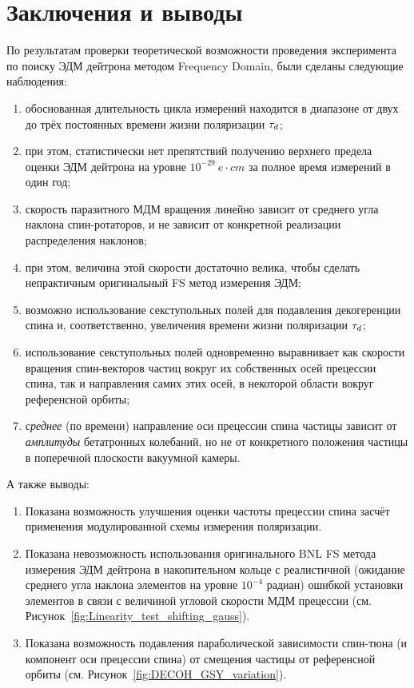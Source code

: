 \documentclass{report}
\newcommand{\home}{\string~}
\begin{document}
\chapter{Заключения и выводы}
По результатам проверки теоретической возможности проведения эксперимента по поиску ЭДМ дейтрона методом Frequency Domain, были сделаны следующие наблюдения:
\begin{enumerate}
\item обоснованная длительность цикла измерений находится в диапазоне от двух до трёх постоянных времени жизни поляризации $\tau_d$;
\item при этом, статистически нет препятствий получению верхнего предела оценки ЭДМ дейтрона на уровне $10^{-29}~e\cdot cm$ за полное время измерений в один год;
\item скорость паразитного МДМ вращения линейно зависит от среднего угла наклона спин-ротаторов, и не зависит от конкретной реализации распределения наклонов;
\item при этом, величина этой скорости достаточно велика, чтобы сделать непрактичным оригинальный FS метод измерения ЭДМ;
\item возможно использование секступольных полей для подавления декогеренции спина и, соответственно, увеличения времени жизни поляризации $\tau_d$;
\item использование секступольных полей одновременно выравнивает как скорости вращения спин-векторов частиц вокруг их собственных осей прецессии спина, так и направления самих этих осей, в некоторой области вокруг референсной орбиты;
\item \emph{среднее} (по времени) направление оси прецессии спина частицы зависит от \emph{амплитуды} бетатронных колебаний, но не от конкретного положения частицы в поперечной плоскости вакуумной камеры.
\end{enumerate}

А также выводы:
\begin{enumerate}
  \item Показана возможность улучшения оценки частоты прецессии спина засчёт применения модулированной схемы измерения поляризации.

\item Показана невозможность использования оригинального BNL FS метода измерения ЭДМ дейтрона в накопительном кольце с реалистичной (ожидание среднего угла наклона элементов на уровне $10^{-4}$ радиан) ошибкой установки элементов в связи с величиной угловой скорости МДМ прецессии (см. Рисунок~\ref{fig:Linearity_test_shifting_gauss}).

\item Показана возможность подавления параболической зависимости спин-тюна (и компонент оси прецессии спина) от смещения частицы от референсной орбиты (см. Рисунок~\ref{fig:DECOH_GSY_variation}).
\end{enumerate}




\end{document}
